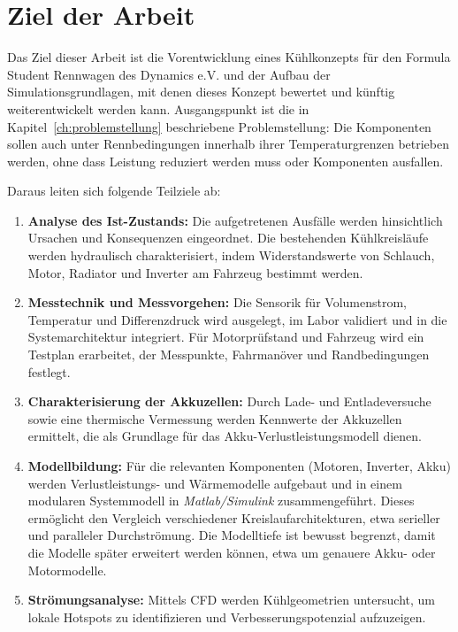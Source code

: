 \chapter{Ziel der Arbeit}
\label{ch:ziel}

Das Ziel dieser Arbeit ist die Vorentwicklung eines Kühlkonzepts für den Formula Student Rennwagen des Dynamics e.V. und der Aufbau der Simulationsgrundlagen, mit denen dieses Konzept bewertet und künftig weiterentwickelt werden kann. Ausgangspunkt ist die in Kapitel~\ref{ch:problemstellung} beschriebene Problemstellung: Die Komponenten sollen auch unter Rennbedingungen innerhalb ihrer Temperaturgrenzen betrieben werden, ohne dass Leistung reduziert werden muss oder Komponenten ausfallen.

Daraus leiten sich folgende Teilziele ab:

\begin{enumerate}
    \item \textbf{Analyse des Ist-Zustands:} Die aufgetretenen Ausfälle werden hinsichtlich Ursachen und Konsequenzen eingeordnet. Die bestehenden Kühlkreisläufe werden hydraulisch charakterisiert, indem Widerstandswerte von Schlauch, Motor, Radiator und Inverter am Fahrzeug bestimmt werden.

    \item \textbf{Messtechnik und Messvorgehen:} Die Sensorik für Volumenstrom, Temperatur und Differenzdruck wird ausgelegt, im Labor validiert und in die Systemarchitektur integriert. Für Motorprüfstand und Fahrzeug wird ein Testplan erarbeitet, der Messpunkte, Fahrmanöver und Randbedingungen festlegt.

    \item \textbf{Charakterisierung der Akkuzellen:} Durch Lade- und Entladeversuche sowie eine thermische Vermessung werden Kennwerte der Akkuzellen ermittelt, die als Grundlage für das Akku-Verlustleistungsmodell dienen.

    \item \textbf{Modellbildung:} Für die relevanten Komponenten (Motoren, Inverter, Akku) werden Verlustleistungs- und Wärmemodelle aufgebaut und in einem modularen Systemmodell in \textit{Matlab/Simulink} zusammengeführt. Dieses ermöglicht den Vergleich verschiedener Kreislaufarchitekturen, etwa serieller und paralleler Durchströmung. Die Modelltiefe ist bewusst begrenzt, damit die Modelle später erweitert werden können, etwa um genauere Akku- oder Motormodelle.

    \item \textbf{Strömungsanalyse:} Mittels CFD werden Kühlgeometrien untersucht, um lokale Hotspots zu identifizieren und Verbesserungspotenzial aufzuzeigen. %


\end{enumerate}
